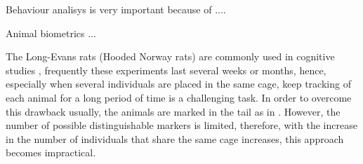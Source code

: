 \documentclass[conference]{IEEEtran}
\begin{document}
Behaviour analisys is very important because of \cite{weissbrod2013automated}.... 

Animal biometrics \cite{kuhl2013animal} ...

The Long-Evans rats (Hooded Norway rats) are commonly used in cognitive studies \cite{lambert2016natural,guarraci2016exposure,turner2014comprehensive}, frequently these experiments last several weeks or months, hence, especially when several individuals are placed in the same cage, keep tracking of each animal for a long period of time is a challenging task. In order to overcome this drawback usually, the animals are marked in the tail as in \cite{lambert2016natural}. However, the number of possible distinguishable markers is limited, therefore, with the increase in the number of individuals that share the same cage increases, this approach becomes impractical. 






\end{document}

